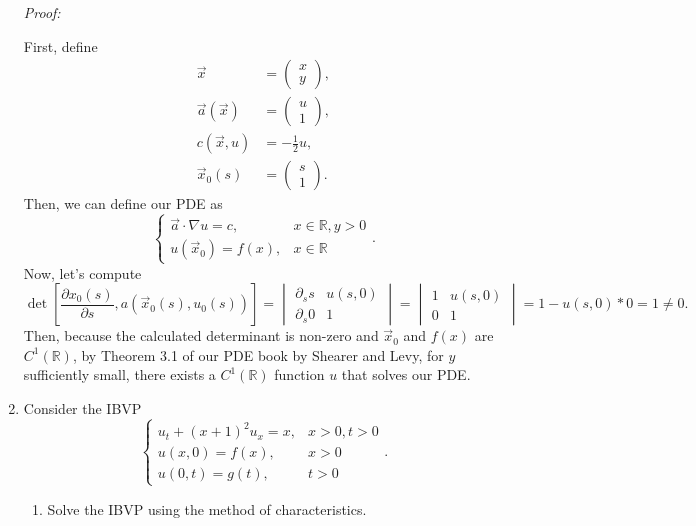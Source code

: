 \documentclass[a4paper,12pt]{article}
\newcommand{\reals}{\mathbb{R}}
\newcommand{\pd}{\partial}
\newcommand{\pmat}[1]{\begin{pmatrix} #1 \end{pmatrix}}
\newenvironment{proof}[2][$\square$]
    {\setlength{\parskip}{0pt}\par\textit{Proof:} #2\setlength{\parskip}{0.25cm}
        \savebox{\qed}{#1}
        \begin{adjustwidth}{\widthof{Proof:}}{}
    }
    {
        \hfill\usebox{\qed}\end{adjustwidth}
    }
\begin{document}
\begin{enumerate}[label = \arabic*.]
			\begin{proof}{}
				First, define
				\begin{align*}
					\vec{x} &= \pmat{x \\ y}, \\
					\vec{a}(\vec{x}) &= \pmat{u \\ 1}, \\
					c(\vec{x}, u) &= - \frac{1}{2}u, \\
					\vec{x}_0(s) &= \pmat{s \\ 1}.
				\end{align*}
				Then, we can define our PDE as
				\[
					\begin{cases}
						\vec{a} \cdot \nabla u = c, & x \in \reals, y > 0 \\
						u(\vec{x}_0) = f(x), & x \in \reals
					\end{cases}.
				\]
				Now, let's compute
				\[
					\det\left[\frac{\pd x_0(s)}{\pd s}, a(\vec{x}_0(s), u_0(s))\right] = 
					\begin{vmatrix}
						\pd_s s & u(s, 0) \\
						\pd_s 0 & 1
					\end{vmatrix}
					=
					\begin{vmatrix}
						1 & u(s, 0) \\
						0 & 1
					\end{vmatrix}
					= 1 - u(s, 0) * 0 = 1 \neq 0.
				\]
				Then, because the calculated determinant is non-zero and $ \vec{x}_0 $ and $ f(x) $ are $ C^1(\reals) $, by Theorem 3.1 of our PDE book by Shearer and Levy, for $ y $ sufficiently small, there exists a $ C^1(\reals) $ function $ u $ that solves our PDE.
			\end{proof}
		
		\item Consider the IBVP
			\[
				\begin{cases}
					u_t + (x + 1)^2 u_x = x, & x > 0, t > 0 \\
					u(x,0) = f(x), & x > 0 \\
					u(0, t) = g(t), & t > 0
				\end{cases}.
			\]
			\begin{enumerate}[label = (\alph*)]
				\item Solve the IBVP using the method of characteristics.
				

\end{enumerate}
\end{enumerate}
\end{document}
